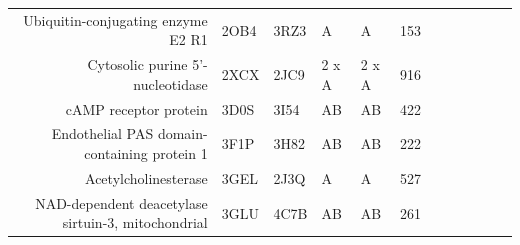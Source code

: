 \begin{table}
\begin{scriptsize}
\begin{tabular}{ r p{0.8cm} p{0.8cm} p{0.8cm} p{0.8cm} r r r r r r r }
\multicolumn{1}{r}{Ubiquitin-conjugating enzyme E2 R1} & \multicolumn{1}{l}{2OB4} & \multicolumn{1}{l}{3RZ3} & \multicolumn{1}{l}{A} & \multicolumn{1}{l}{A} & 153   & \cellcolor[rgb]{ .573,  .816,  .314}  & \cellcolor[rgb]{ .573,  .816,  .314}  & \cellcolor[rgb]{ 1,  1,  0}  & \cellcolor[rgb]{ .573,  .816,  .314}  & \cellcolor[rgb]{ .573,  .816,  .314}  & \cellcolor[rgb]{ .573,  .816,  .314}  \\
\multicolumn{1}{r}{Cytosolic purine 5'-nucleotidase} & \multicolumn{1}{l}{2XCX} & \multicolumn{1}{l}{2JC9} & \multicolumn{1}{l}{2 x A} & \multicolumn{1}{l}{2 x A} & 916   & \cellcolor[rgb]{ .573,  .816,  .314}  & \cellcolor[rgb]{ 1,  .494,  .475}  & \cellcolor[rgb]{ 1,  .494,  .475}  & \cellcolor[rgb]{ 1,  .494,  .475}  & \cellcolor[rgb]{ .573,  .816,  .314}  & \cellcolor[rgb]{ 1,  .494,  .475}  \\
\multicolumn{1}{r}{cAMP receptor protein} & \multicolumn{1}{l}{3D0S} & \multicolumn{1}{l}{3I54} & \multicolumn{1}{l}{AB} & \multicolumn{1}{l}{AB} & 422   & \cellcolor[rgb]{ .573,  .816,  .314}  & \cellcolor[rgb]{ .573,  .816,  .314}  & \cellcolor[rgb]{ .573,  .816,  .314}  & \cellcolor[rgb]{ .573,  .816,  .314}  & \cellcolor[rgb]{ .573,  .816,  .314}  & \cellcolor[rgb]{ .573,  .816,  .314}  \\
\multicolumn{1}{r}{Endothelial PAS domain-containing protein 1} & \multicolumn{1}{l}{3F1P} & \multicolumn{1}{l}{3H82} & \multicolumn{1}{l}{AB} & \multicolumn{1}{l}{AB} & 222   & \cellcolor[rgb]{ 1,  .494,  .475}  & \cellcolor[rgb]{ .573,  .816,  .314}  & \cellcolor[rgb]{ 1,  .494,  .475}  & \cellcolor[rgb]{ .573,  .816,  .314}  & \cellcolor[rgb]{ .573,  .816,  .314}  & \cellcolor[rgb]{ .573,  .816,  .314}  \\
\multicolumn{1}{r}{Acetylcholinesterase} & \multicolumn{1}{l}{3GEL} & \multicolumn{1}{l}{2J3Q} & \multicolumn{1}{l}{A} & \multicolumn{1}{l}{A} & 527   & \cellcolor[rgb]{ 1,  .494,  .475}  & \cellcolor[rgb]{ 1,  .494,  .475}  & \cellcolor[rgb]{ 1,  .494,  .475}  & \cellcolor[rgb]{ .573,  .816,  .314}  & \cellcolor[rgb]{ .573,  .816,  .314}  & \cellcolor[rgb]{ .573,  .816,  .314}  \\
\multicolumn{1}{r}{NAD-dependent deacetylase sirtuin-3, mitochondrial} & \multicolumn{1}{l}{3GLU} & \multicolumn{1}{l}{4C7B} & \multicolumn{1}{l}{AB} & \multicolumn{1}{l}{AB} & 261   & \cellcolor[rgb]{ .573,  .816,  .314}  & \cellcolor[rgb]{ 1,  .494,  .475}  & \cellcolor[rgb]{ .573,  .816,  .314}  & \cellcolor[rgb]{ .573,  .816,  .314}  & \cellcolor[rgb]{ .573,  .816,  .314}  & \cellcolor[rgb]{ .573,  .816,  .314}  \\

\end{tabular}
\end{scriptsize}
\end{table}
